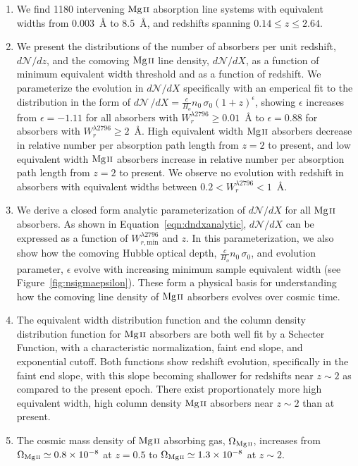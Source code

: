 \documentclass[iop,apj,numberedappendix,appendixfloats,twocolappendix]{emulateapj}
\begin{document}
\begin{enumerate}
\item We find 1180 intervening ${\hbox{{\rm Mg}\kern 0.1em{\sc ii}}}$ absorption line systems with equivalent widths from $0.003$~{\AA} to $8.5$~{\AA}, and redshifts spanning $0.14 \le z \le 2.64$.
\item We present the distributions of the number of absorbers per unit redshift, $d\mathcal{N}\!/dz$, and the comoving ${\hbox{{\rm Mg}\kern 0.1em{\sc ii}}}$ line density, $d\mathcal{N}\!/dX$, as a function of minimum equivalent width threshold and as a function of redshift. We parameterize the evolution in $d\mathcal{N}\!/dX$ specifically with an emperical fit to the distribution in the form of $d\mathcal{N}\,/dX = \frac{c}{H_o}n_0\,\sigma_0(1 + z)^{\epsilon}$, showing $\epsilon$ increases from $\epsilon=-1.11$ for all absorbers with $W_r^{\lambda2796} \ge 0.01$~{\AA} to $\epsilon=0.88$ for absorbers with $W_r^{\lambda2796} \ge 2$~{\AA}. High equivalent width ${\hbox{{\rm Mg}\kern 0.1em{\sc ii}}}$ absorbers decrease in relative number per absorption path length from $z = 2$ to present, and low equivalent width ${\hbox{{\rm Mg}\kern 0.1em{\sc ii}}}$ absorbers increase in relative number per absorption path length from $z = 2$ to present. We observe no evolution with redshift in absorbers with equivalent widths between $0.2 < W_r^{\lambda2796} < 1$~{\AA}.
\item We derive a closed form analytic parameterization of $d\mathcal{N}\!/dX$ for all ${\hbox{{\rm Mg}\kern 0.1em{\sc ii}}}$ absorbers. As shown in Equation~\ref{eqn:dndxanalytic}, $d\mathcal{N}\!/dX$ can be expressed as a function of $W_{r,\mathrm{min}}^{\lambda2796}$ and $z$. In this parameterization, we also show how the comoving Hubble optical depth, $\frac{c}{H_o}n_0\,\sigma_0$, and evolution parameter, $\epsilon$ evolve with increasing minimum sample equivalent width (see Figure~\ref{fig:nsigmaepsilon}). These form a physical basis for understanding how the comoving line density of ${\hbox{{\rm Mg}\kern 0.1em{\sc ii}}}$ absorbers evolves over cosmic time.
\item The equivalent width distribution function and the column density distribution function for ${\hbox{{\rm Mg}\kern 0.1em{\sc ii}}}$ absorbers are both well fit by a Schecter Function, with a characteristic normalization, faint end slope, and exponential cutoff. Both functions show redshift evolution, specifically in the faint end slope, with this slope becoming shallower for redshifts near $z \sim 2$ as compared to the present epoch. There exist proportionately more high equivalent width, high column density ${\hbox{{\rm Mg}\kern 0.1em{\sc ii}}}$ absorbers near $z \sim 2$ than at present.
\item The cosmic mass density of ${\hbox{{\rm Mg}\kern 0.1em{\sc ii}}}$ absorbing gas, $\Omega_{\hbox{\scriptsize {\MgII}}}$, increases from $\Omega_{\hbox{\scriptsize {\MgII}}} \simeq 0.8\times10^{-8}$ at $z = 0.5$ to $\Omega_{\hbox{\scriptsize {\MgII}}} \simeq 1.3\times10^{-8}$ at $z \sim 2$.

\end{enumerate}
\end{document}
